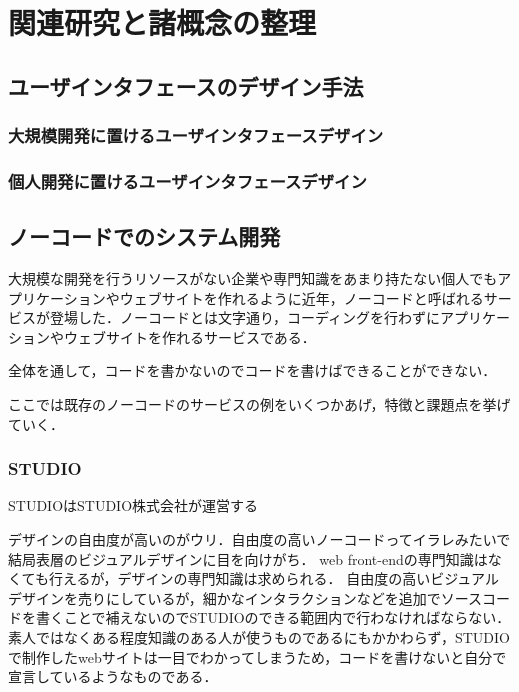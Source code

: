 \chapter{関連研究と諸概念の整理}
\label{chap:prevresearch}

\section{ユーザインタフェースのデザイン手法}

\subsection{大規模開発に置けるユーザインタフェースデザイン}
\subsection{個人開発に置けるユーザインタフェースデザイン}

\section{ノーコードでのシステム開発}
大規模な開発を行うリソースがない企業や専門知識をあまり持たない個人でもアプリケーションやウェブサイトを作れるように近年，ノーコードと呼ばれるサービスが登場した．ノーコードとは文字通り，コーディングを行わずにアプリケーションやウェブサイトを作れるサービスである．

全体を通して，コードを書かないのでコードを書けばできることができない．


ここでは既存のノーコードのサービスの例をいくつかあげ，特徴と課題点を挙げていく．
\subsection{STUDIO}
STUDIOはSTUDIO株式会社が運営する

デザインの自由度が高いのがウリ．自由度の高いノーコードってイラレみたいで結局表層のビジュアルデザインに目を向けがち．
web front-endの専門知識はなくても行えるが，デザインの専門知識は求められる．
自由度の高いビジュアルデザインを売りにしているが，細かなインタラクションなどを追加でソースコードを書くことで補えないのでSTUDIOのできる範囲内で行わなければならない．
素人ではなくある程度知識のある人が使うものであるにもかかわらず，STUDIOで制作したwebサイトは一目でわかってしまうため，コードを書けないと自分で宣言しているようなものである．

